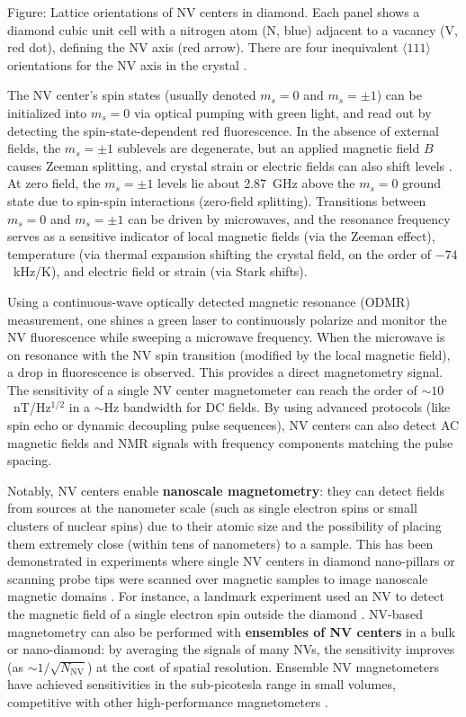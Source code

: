 Figure: Lattice orientations of NV centers in diamond. Each panel
shows a diamond cubic unit cell with a nitrogen atom (N, blue)
adjacent to a vacancy (V, red dot), defining the NV axis (red
arrow). There are four inequivalent $\langle 111 \rangle$ orientations
for the NV axis in the crystal .



The NV center’s spin states (usually denoted $m_s = 0$ and $m_s =
\pm1$) can be initialized into $m_s=0$ via optical pumping with green
light, and read out by detecting the spin-state-dependent red
fluorescence. In the absence of external fields, the $m_s=\pm1$
sublevels are degenerate, but an applied magnetic field $B$ causes
Zeeman splitting, and crystal strain or electric fields can also shift
levels . At zero field, the $m_s=\pm1$ levels lie about 2.87~GHz above
the $m_s=0$ ground state due to spin-spin interactions (zero-field
splitting). Transitions between $m_s=0$ and $m_s=\pm1$ can be driven
by microwaves, and the resonance frequency serves as a sensitive
indicator of local magnetic fields (via the Zeeman effect),
temperature (via thermal expansion shifting the crystal field, on the
order of $-74$~kHz/K), and electric field or strain (via Stark
shifts).



Using a continuous-wave optically detected magnetic resonance (ODMR)
measurement, one shines a green laser to continuously polarize and
monitor the NV fluorescence while sweeping a microwave frequency. When
the microwave is on resonance with the NV spin transition (modified by
the local magnetic field), a drop in fluorescence is observed. This
provides a direct magnetometry signal. The sensitivity of a single NV
center magnetometer can reach the order of $\sim 10$~nT/Hz$^{1/2}$ in
a $\sim$Hz bandwidth for DC fields. By using advanced protocols (like
spin echo or dynamic decoupling pulse sequences), NV centers can also
detect AC magnetic fields and NMR signals with frequency components
matching the pulse spacing.



Notably, NV centers enable \textbf{nanoscale magnetometry}: they can
detect fields from sources at the nanometer scale (such as single
electron spins or small clusters of nuclear spins) due to their atomic
size and the possibility of placing them extremely close (within tens
of nanometers) to a sample. This has been demonstrated in experiments
where single NV centers in diamond nano-pillars or scanning probe tips
were scanned over magnetic samples to image nanoscale magnetic domains
. For instance, a landmark experiment used an NV to detect the
magnetic field of a single electron spin outside the diamond
. NV-based magnetometry can also be performed with \textbf{ensembles
  of NV centers} in a bulk or nano-diamond: by averaging the signals
of many NVs, the sensitivity improves (as $\sim
1/\sqrt{N_{\text{NV}}}$) at the cost of spatial resolution. Ensemble
NV magnetometers have achieved sensitivities in the sub-picotesla
range in small volumes, competitive with other high-performance
magnetometers .



